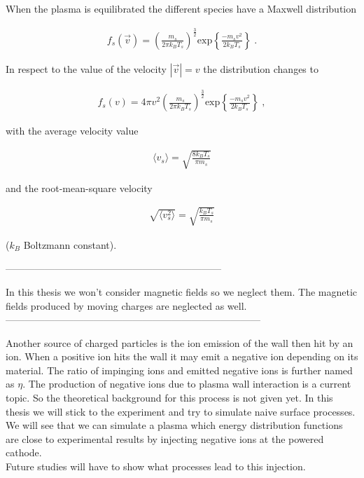 When the plasma is equilibrated the different species have a Maxwell distribution

\begin{align}
    f_s(\vec{v}) = \left(\frac{m_s}{2 \pi k_B T_s}\right)^{\frac{3}{2}} \mathrm{exp}\left\{ \frac{-m_s v^2}{2 k_B T_s}\right\} \; .
\end{align}

In respect to the value of the velocity $|\vec{v}|=v$ the distribution changes to 

\begin{align}
    f_s(v) = 4\pi v^2 \left(\frac{m_s}{2 \pi k_B T_s}\right)^{\frac{3}{2}} \mathrm{exp}\left\{ \frac{-m_s v^2}{2 k_B T_s}\right\} \; ,
\end{align}

with the average velocity value 

\begin{align}
\langle v_s \rangle = \sqrt{\frac{8 k_B T_s}{\pi m_s}}
\end{align}

and the root-mean-square velocity

\begin{align}
    \sqrt{\langle v_s^2 \rangle} = \sqrt{\frac{k_B T_s}{\pi m_s}} 
\end{align}

($k_B$ Boltzmann constant). 

------------------------------------------------------------------


In this thesis we won't consider magnetic fields so we neglect them. The magnetic fields produced by moving charges are neglected as well.\\


------------------------------------------------------------------------------

Another source of charged particles is the ion emission of the wall then hit by an ion. 
When a positive ion hits the wall it may emit a negative ion depending on its material. 
The ratio of impinging ions and emitted negative ions is further named as $\eta$. 
The production of negative ions due to plasma wall interaction is a current topic.
So the theoretical background for this process is not given yet.
In this thesis we will stick to the experiment and try to simulate naive surface processes.
We will see that we can simulate a plasma which energy distribution functions are close to  experimental results by injecting negative ions at the powered cathode.\\
Future studies will have to show what processes lead to this injection.



